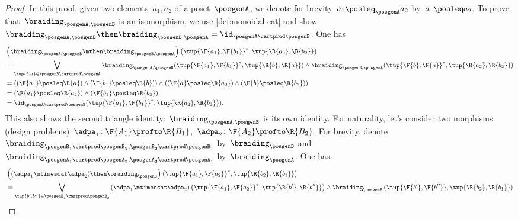 \begin{proof}
    In this proof, given two elements~$a_1,a_2$ of a poset~$\posgenA$, we denote for brevity~$a_1 \posleq_\posgenA a_2$ by~$a_1 \posleq a_2$.
    To prove that~$\braiding_{\posgenA,\posgenB}$ is an isomorphism, we use \cref{def:monoidal-cat} and show~$\braiding_{\posgenA,\posgenB}\then \braiding_{\posgenB,\posgenA}=\id_{\posgenA\cartprod \posgenB}$.
    One has
    \begin{equation}
        \begin{aligned}
            &\left( \braiding_{\posgenA,\posgenB}\mthen \braiding_{\posgenB,\posgenA}\right) \left( \tup{\F{a_1},\F{b_1}}^*,\tup{\R{a_2},\R{b_2}}\right)\\
            &=\bigvee_{\tup{b,a}\in \posgenB\cartprod \posgenA}\braiding_{\posgenA,\posgenB}(\tup{\F{a_1},\F{b_1}}^*,\tup{\R{b},\R{a}})\wedge \braiding_{\posgenB,\posgenA}(\tup{\F{b},\F{a}}^*,\tup{\R{a_2},\R{b_2}})\\
            &=\left( (\F{a_1}\posleq \R{a}) \wedge (\F{b_1}\posleq \R{b})\right)\wedge \left((\F{a}\posleq \R{a_2}) \wedge (\F{b}\posleq \R{b_2})\right)\\
            &=(\F{a_1}\posleq \R{a_2})\wedge (\F{b_1}\posleq \R{b_2})\\
            &=\id_{\posgenA\cartprod \posgenB}(\tup{\F{a_1},\F{b_1}}^*,\tup{\R{a_2},\R{b_2}}).
        \end{aligned}
    \end{equation}
    This also shows the second triangle identity: $\braiding_{\posgenA,\posgenB}$ is its own identity.
    For naturality, let's consider two morphisms (design problems)~$\adpa_1\colon \F{A_1}\profto \R{B_1}$,~$\adpa_2\colon \F{A_2}\profto \R{B_2}$.
    For brevity, denote~$\braiding_{\posgenB_1\cartprod \posgenB_2,\posgenB_2\cartprod \posgenB_1}$ by~$\braiding_\posgenB$ and~$\braiding_{\posgenA_1\cartprod \posgenA_2,\posgenA_2\cartprod \posgenA_1}$ by~$\braiding_\posgenA$.
    One has
    \begin{equation}
        \begin{aligned}
            &\left((\adpa_1\mtimescat \adpa_2)\then \braiding_\posgenB \right)\left( \tup{\F{a_1},\F{a_2}}^*,\tup{\R{b_2},\R{b_1}}\right)\\
            &=\bigvee_{\tup{b',b''}\in \posgenB_1\cartprod \posgenB_2} \left(\adpa_1\mtimescat \adpa_2\right) \left( \tup{\F{a_1},\F{a_2}}^*,\tup{\R{b'},\R{b''}}\right)\wedge \braiding_\posgenB\left(\tup{\F{b'},\F{b''}},\tup{\R{b_2},\R{b_1}} \right)\\

\end{aligned}
\end{equation}
\end{proof}
